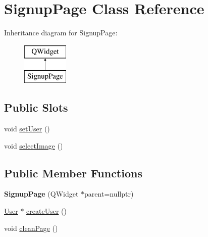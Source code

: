 \hypertarget{classSignupPage}{\section{Signup\-Page Class Reference}
\label{classSignupPage}
}
Inheritance diagram for Signup\-Page\-:\begin{figure}[H]
\begin{center}
\leavevmode
\includegraphics[height=2.000000cm]{classSignupPage}
\end{center}
\end{figure}
\subsection*{Public Slots}
\begin{DoxyCompactItemize}
\item 
void \hyperlink{classSignupPage_ab42434ae99ddc49856abdf513ae80884}{set\-User} ()
\item 
void \hyperlink{classSignupPage_abdb7ff1100d852d074c9724cf695ab06}{select\-Image} ()
\end{DoxyCompactItemize}
\subsection*{Public Member Functions}
\begin{DoxyCompactItemize}
\item 
\hypertarget{classSignupPage_af41bce1fd7c7e7f6b78e7dd0e790f1c5}{{\bfseries Signup\-Page} (Q\-Widget $\ast$parent=nullptr)}\label{classSignupPage_af41bce1fd7c7e7f6b78e7dd0e790f1c5}

\item 
\hyperlink{classUser}{User} $\ast$ \hyperlink{classSignupPage_ac6f433285ca77bcfa6bae1d3b37cd5b5}{create\-User} ()
\item 
void \hyperlink{classSignupPage_aef2b54e11fa46f9c887e696a7eb9d786}{clean\-Page} ()
\end{DoxyCompactItemize}
